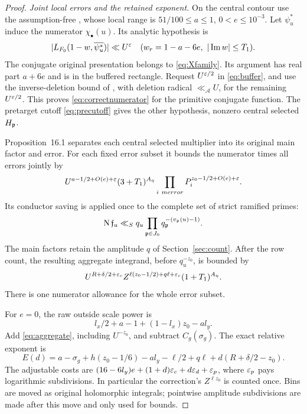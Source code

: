 \begin{proof}
\emph{Joint local errors and the retained exponent.}
On the central contour use the assumption-free , whose local range is $51/100\le a\le1$, $0<e\le10^{-3}$. Let $\psi_u^*$ induce the numerator $\chi_\bullet(u)$. Its analytic hypothesis is
\begin{equation}\label{eq:correctnumerator}
 |L_{F_0}(1-w,\overline{\psi_u^*})|\ll U^\varepsilon
 \quad(w_r=1-a-6e,\ |\operatorname{Im} w|\le T_1).
\end{equation}
The conjugate original presentation belongs to \eqref{eq:Xfamily}. Its argument has real part $a+6e$ and is in the buffered rectangle. Request $U^{\varepsilon/2}$ in \eqref{eq:buffer}, and use the inverse-deletion bound of , with deletion radical $\ll_{\mathcal A}U$, for the remaining $U^{\varepsilon/2}$. This proves \eqref{eq:correctnumerator} for the primitive conjugate function. The pretarget cutoff \eqref{eq:precutoff} gives the other hypothesis, nonzero central selected $H_\mathfrak p$.

Proposition~16.1 separates each central selected multiplier into its original main factor and error. For each fixed error subset it bounds the numerator times all errors jointly by
\[
 U^{a-1/2+O(e)+\varepsilon}(3+T_1)^{A_\eta}
 \prod_{i\ {
m error}}P_i^{z_0-1/2+O(e)+\varepsilon}.
\]
Its conductor saving is applied once to the complete set of strict ramified primes:
\[
 \operatorname{N}\mathfrak f_u\ll_S q_u
 \prod_{\mathfrak p\in J_0}q_\mathfrak p^{-(v_\mathfrak p(u)-1)}.
\]
The main factors retain the amplitude $q$ of Section~\ref{sec:count}. After the row count, the resulting aggregate integrand, before $q_u^{-z_0}$, is bounded by
\begin{equation}\label{eq:aggregate}
 U^{R+\delta/2+\varepsilon_c}Z^{\ell(z_0-1/2)+q\ell+\varepsilon_c}(1+T_1)^{A_\eta}.
\end{equation}
There is one numerator allowance for the whole error subset.

For $e=0$, the raw outside scale power is
\[
 l_x/2+a-1+(1-l_x)z_0-a l_y.
\]
Add \eqref{eq:aggregate}, including $U^{-z_0}$, and subtract $C_g(\sigma_g)$. The exact relative exponent is
\begin{equation}\label{eq:Ed}
 E(d)=a-\sigma_g+h(z_0-1/6)-a l_y-\ell/2+q\ell
                   +d(R+\delta/2-z_0).
\end{equation}
The adjustable costs are $(16-6l_y)e+(1+d)\varepsilon_c+d\varepsilon_d+\varepsilon_p$, where $\varepsilon_p$ pays logarithmic subdivisions. In particular the correction's $Z^{\ell z_0}$ is counted once. Bins are moved as original holomorphic integrals; pointwise amplitude subdivisions are made after this move and only used for bounds.


\end{proof}

